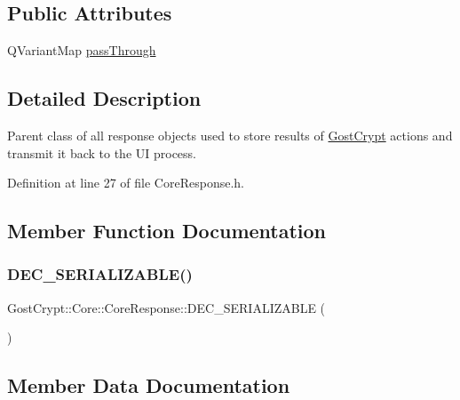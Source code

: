 \subsection*{Public Attributes}
\begin{DoxyCompactItemize}
\item 
Q\+Variant\+Map \hyperlink{struct_gost_crypt_1_1_core_1_1_core_response_a91038b761a279963a7fc92c25ba134bc}{pass\+Through}
\end{DoxyCompactItemize}


\subsection{Detailed Description}
Parent class of all response objects used to store results of \hyperlink{namespace_gost_crypt}{Gost\+Crypt} actions and transmit it back to the UI process. 

Definition at line 27 of file Core\+Response.\+h.



\subsection{Member Function Documentation}
\mbox{\label{struct_gost_crypt_1_1_core_1_1_core_response_a689f4e914d5e1a18b2c4cc7d9a0753de}} 
\subsubsection{\texorpdfstring{D\+E\+C\+\_\+\+S\+E\+R\+I\+A\+L\+I\+Z\+A\+B\+L\+E()}{DEC\_SERIALIZABLE()}}
{\footnotesize\ttfamily Gost\+Crypt\+::\+Core\+::\+Core\+Response\+::\+D\+E\+C\+\_\+\+S\+E\+R\+I\+A\+L\+I\+Z\+A\+B\+LE (\begin{DoxyParamCaption}\item[{\hyperlink{struct_gost_crypt_1_1_core_1_1_core_response}{Core\+Response}}]{ }\end{DoxyParamCaption})}



\subsection{Member Data Documentation}
\mbox{\label{struct_gost_crypt_1_1_core_1_1_core_response_a91038b761a279963a7fc92c25ba134bc}} 
